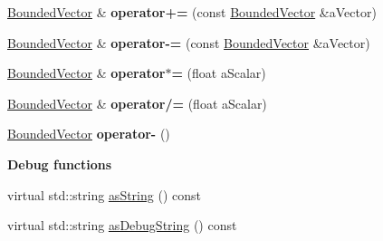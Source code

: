 \begin{DoxyCompactItemize}
\item 
\hyperlink{class_model_1_1_bounded_vector}{Bounded\+Vector} \& {\bfseries operator+=} (const \hyperlink{class_model_1_1_bounded_vector}{Bounded\+Vector} \&a\+Vector)\hypertarget{class_model_1_1_bounded_vector_a6f707a9499dc1a1a4051fa2b40f8d40d}{}\label{class_model_1_1_bounded_vector_a6f707a9499dc1a1a4051fa2b40f8d40d}

\item 
\hyperlink{class_model_1_1_bounded_vector}{Bounded\+Vector} \& {\bfseries operator-\/=} (const \hyperlink{class_model_1_1_bounded_vector}{Bounded\+Vector} \&a\+Vector)\hypertarget{class_model_1_1_bounded_vector_ae1cb231bfe977d563eebfd47526cb1c0}{}\label{class_model_1_1_bounded_vector_ae1cb231bfe977d563eebfd47526cb1c0}

\item 
\hyperlink{class_model_1_1_bounded_vector}{Bounded\+Vector} \& {\bfseries operator$\ast$=} (float a\+Scalar)\hypertarget{class_model_1_1_bounded_vector_aeed3b7e66556126aee3478daa6f9199b}{}\label{class_model_1_1_bounded_vector_aeed3b7e66556126aee3478daa6f9199b}

\item 
\hyperlink{class_model_1_1_bounded_vector}{Bounded\+Vector} \& {\bfseries operator/=} (float a\+Scalar)\hypertarget{class_model_1_1_bounded_vector_ac949b337eed72116f01507c7bba5820a}{}\label{class_model_1_1_bounded_vector_ac949b337eed72116f01507c7bba5820a}

\item 
\hyperlink{class_model_1_1_bounded_vector}{Bounded\+Vector} {\bfseries operator-\/} ()\hypertarget{class_model_1_1_bounded_vector_a05b571d646e8c226c3bef443cbdb00f7}{}\label{class_model_1_1_bounded_vector_a05b571d646e8c226c3bef443cbdb00f7}

\end{DoxyCompactItemize}
\begin{Indent}{\bf Debug functions}\par
\begin{DoxyCompactItemize}
\item 
virtual std\+::string \hyperlink{class_model_1_1_bounded_vector_a5a0115cf9e87c118474d507efcbaddfb}{as\+String} () const 
\item 
virtual std\+::string \hyperlink{class_model_1_1_bounded_vector_aa04899e137a269e9ab116535c4fadc07}{as\+Debug\+String} () const 
\end{DoxyCompactItemize}
\end{Indent}
